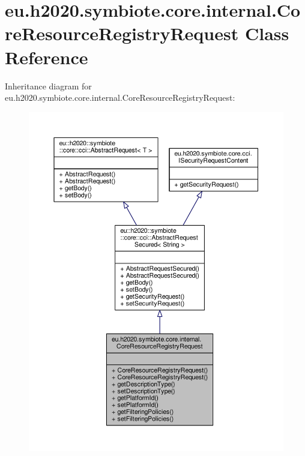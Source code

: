 \hypertarget{classeu_1_1h2020_1_1symbiote_1_1core_1_1internal_1_1CoreResourceRegistryRequest}{}\section{eu.\+h2020.\+symbiote.\+core.\+internal.\+Core\+Resource\+Registry\+Request Class Reference}
\label{classeu_1_1h2020_1_1symbiote_1_1core_1_1internal_1_1CoreResourceRegistryRequest}


Inheritance diagram for eu.\+h2020.\+symbiote.\+core.\+internal.\+Core\+Resource\+Registry\+Request\+:
\nopagebreak
\begin{figure}[H]
\begin{center}
\leavevmode
\includegraphics[width=350pt]{classeu_1_1h2020_1_1symbiote_1_1core_1_1internal_1_1CoreResourceRegistryRequest__inherit__graph}
\end{center}
\end{figure}


